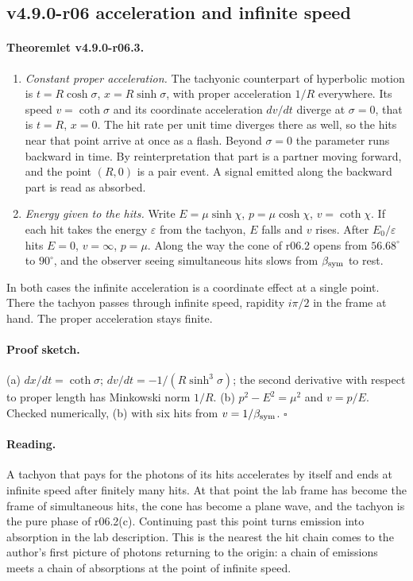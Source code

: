 \subsection*{v4.9.0-r06 acceleration and infinite speed}
\label{subsec:v490-r06-acceleration}

\paragraph{Theoremlet v4.9.0-r06.3.}
\begin{enumerate}[leftmargin=2em]
\item[(a)] \emph{Constant proper acceleration.}  The tachyonic counterpart of hyperbolic motion is
\(t=R\cosh\sigma\), \(x=R\sinh\sigma\), with proper acceleration \(1/R\) everywhere.  Its speed \(v=\coth\sigma\) and its
coordinate acceleration \(dv/dt\) diverge at \(\sigma=0\), that is \(t=R\), \(x=0\).  The hit rate per unit time diverges
there as well, so the hits near that point arrive at once as a flash.  Beyond \(\sigma=0\) the parameter runs backward in
time.  By reinterpretation that part is a partner moving forward, and the point \((R,0)\) is a pair event.  A signal emitted
along the backward part is read as absorbed.
\item[(b)] \emph{Energy given to the hits.}  Write \(E=\mu\sinh\chi\), \(p=\mu\cosh\chi\), \(v=\coth\chi\).  If each hit
takes the energy \(\varepsilon\) from the tachyon, \(E\) falls and \(v\) rises.  After \(E_0/\varepsilon\) hits \(E=0\),
\(v=\infty\), \(p=\mu\).  Along the way the cone of r06.2 opens from \(56.68^\circ\) to \(90^\circ\), and the observer
seeing simultaneous hits slows from \(\beta_{\mathrm{sym}}\) to rest.
\end{enumerate}
In both cases the infinite acceleration is a coordinate effect at a single point.  There the tachyon passes through infinite
speed, rapidity \(i\pi/2\) in the frame at hand.  The proper acceleration stays finite.

\paragraph{Proof sketch.}
(a) \(dx/dt=\coth\sigma\); \(dv/dt=-1/(R\sinh^3\sigma)\); the second derivative with respect to proper length has Minkowski
norm \(1/R\).  (b) \(p^2-E^2=\mu^2\) and \(v=p/E\).  Checked numerically, (b) with six hits from \(v=1/\beta_{\mathrm{sym}}\).  \(\square\)

\paragraph{Reading.}
A tachyon that pays for the photons of its hits accelerates by itself and ends at infinite speed after finitely many
hits.  At that point the lab frame has become the frame of simultaneous hits, the cone has become a plane wave, and the
tachyon is the pure phase of r06.2(c).  Continuing past this point turns emission into absorption in the lab description.
This is the nearest the hit chain comes to the author's first picture of photons returning to the origin: a chain of
emissions meets a chain of absorptions at the point of infinite speed.

